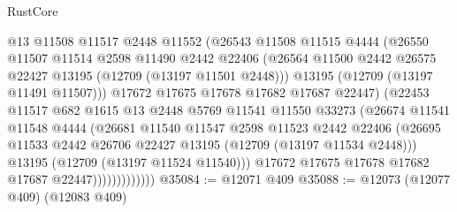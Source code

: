 \begin{lexlean}{RustCore}
\begin{coremodule}
                          @13
                          @11508
                          @11517
                          @2448
                          @11552
                          (@26543
                            @11508
                            @11515
                            @4444
                            (@26550
                              @11507
                              @11514
                              @2598
                              @11490
                              @2442
                              @22406
                              (@26564
                                @11500
                                @2442
                                @26575
                                @22427
                                @13195
                                (@12709 (@13197 @11501 @2448)))
                              @13195
                              (@12709 (@13197 @11491 @11507)))
                            @17672
                            @17675
                            @17678
                            @17682
                            @17687
                            @22447)
                          (@22453
                            @11517
                            @682
                            @1615
                            @13
                            @2448
                            @5769
                            @11541
                            @11550
                            @33273
                            (@26674
                              @11541
                              @11548
                              @4444
                              (@26681
                                @11540
                                @11547
                                @2598
                                @11523
                                @2442
                                @22406
                                (@26695
                                  @11533
                                  @2442
                                  @26706
                                  @22427
                                  @13195
                                  (@12709 (@13197 @11534 @2448)))
                                @13195
                                (@12709 (@13197 @11524 @11540)))
                              @17672
                              @17675
                              @17678
                              @17682
                              @17687
                              @22447)))))))))))))
@35084 := @12071 @409
@35088 := @12073 (@12077 @409) (@12083 @409)

\end{coremodule}
\end{lexlean}
